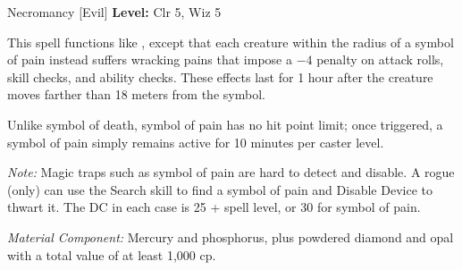 {Necromancy [Evil]}
{
	\textbf{Level:}
	Clr 5, Wiz 5\\
}
{
	This spell functions like , except that each creature within the radius of a symbol of pain instead suffers wracking pains that impose a $-4$ penalty on attack rolls, skill checks, and ability checks. These effects last for 1 hour after the creature moves farther than 18 meters from the symbol.

	Unlike symbol of death, symbol of pain has no hit point limit; once triggered, a symbol of pain simply remains active for 10 minutes per caster level.

	\textit{Note:} Magic traps such as symbol of pain are hard to detect and disable. A rogue (only) can use the Search skill to find a symbol of pain and Disable Device to thwart it. The DC in each case is 25 + spell level, or 30 for symbol of pain.

	\textit{Material Component:}
	Mercury and phosphorus, plus powdered diamond and opal with a total value of at least 1,000 cp.

}
